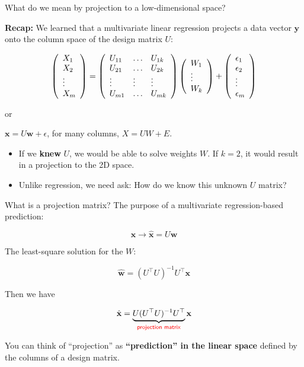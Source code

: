 \documentclass[
  ignorenonframetext,
  aspectratio=169]{beamer}
\begin{document}
\begin{frame}{What do we mean by projection to a low-dimensional space?}
\protect\hypertarget{what-do-we-mean-by-projection-to-a-low-dimensional-space}{}
\scriptsize

\normalsize

\textbf{Recap:} We learned that a multivariate linear regression
projects a data vector \(\mathbf{y}\) onto the column space of the
design matrix \(U\):

\[\left(\begin{array}{l}
X_{1}\\
X_{2}\\
\vdots \\
X_{m}\\
\end{array}
\right) = 
\left(
\begin{array}{l l l}
U_{11} & \ldots & U_{1k}\\
U_{21} & \ldots & U_{2k}\\
\vdots & \vdots & \vdots \\
U_{m1} & \ldots & U_{mk}\\
\end{array} 
\right)
\left(
\begin{array}{l}
W_{1}\\
\vdots\\
W_{k}
\end{array}
\right)
+ 
\left(
\begin{array}{l}
\epsilon_{1}\\
\epsilon_{2}\\
\vdots\\
\epsilon_{m}
\end{array}
\right)\]

or

\(\mathbf{x} = U \mathbf{w} + \epsilon\), for many columns,
\(X = U W + E\).

\begin{itemize}
\item
  If we \textbf{knew} \(U\), we would be able to solve weights \(W\). If
  \(k = 2\), it would result in a projection to the 2D space.
\item
  Unlike regression, we need ask: How do we know this unknown \(U\)
  matrix?
\end{itemize}
\end{frame}

\begin{frame}{What is a projection matrix?}
\protect\hypertarget{what-is-a-projection-matrix}{}
The purpose of a multivariate regression-based prediction:

\[\mathbf{x} \to \hat{\mathbf{x}} = U \mathbf{w}\]

The least-square solution for the \(W\):

\[\hat{\mathbf{w}} = (U^{\top}U)^{-1} U^{\top}\mathbf{x}\]

Then we have

\[\hat{\mathbf{x}} = \underbrace{U (U^{\top}U)^{-1} U^{\top}}_{\textsf{\color{red} projection matrix}} \mathbf{x}\]

You can think of ``projection'' as \textbf{``prediction'' in the linear
space} defined by the columns of a design matrix.
\end{frame}
\end{document}
